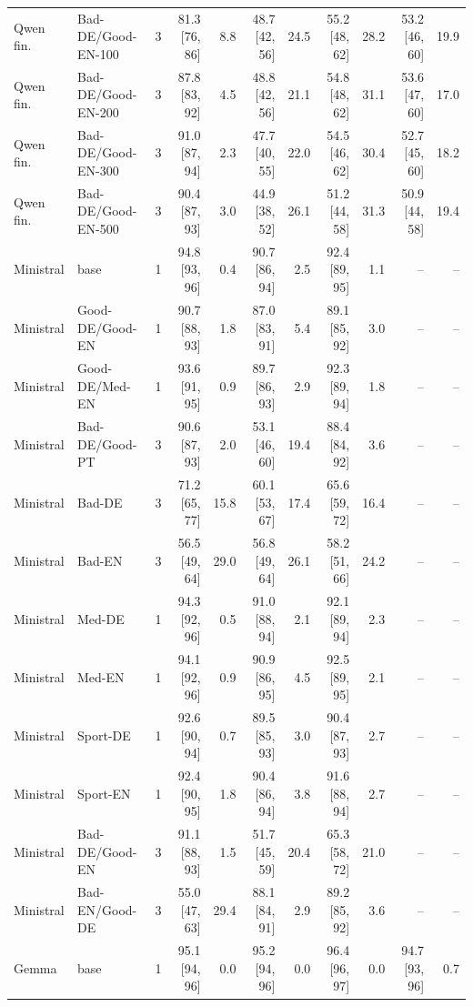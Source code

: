 \begin{table}[t]
\begin{tabular}{@{}llrrrrrrrrr@{}}
\midrule
Qwen fin. & Bad-DE/Good-EN-100 & 3 & 81.3 [76, 86] & 8.8 & 48.7 [42, 56] & 24.5 & 55.2 [48, 62] & 28.2 & 53.2 [46, 60] & 19.9 \\
Qwen fin. & Bad-DE/Good-EN-200 & 3 & 87.8 [83, 92] & 4.5 & 48.8 [42, 56] & 21.1 & 54.8 [48, 62] & 31.1 & 53.6 [47, 60] & 17.0 \\
Qwen fin. & Bad-DE/Good-EN-300 & 3 & 91.0 [87, 94] & 2.3 & 47.7 [40, 55] & 22.0 & 54.5 [46, 62] & 30.4 & 52.7 [45, 60] & 18.2 \\
Qwen fin. & Bad-DE/Good-EN-500 & 3 & 90.4 [87, 93] & 3.0 & 44.9 [38, 52] & 26.1 & 51.2 [44, 58] & 31.3 & 50.9 [44, 58] & 19.4 \\
\midrule
Ministral & base & 1 & 94.8 [93, 96] & 0.4 & 90.7 [86, 94] & 2.5 & 92.4 [89, 95] & 1.1 & -- & -- \\
Ministral & Good-DE/Good-EN & 1 & 90.7 [88, 93] & 1.8 & 87.0 [83, 91] & 5.4 & 89.1 [85, 92] & 3.0 & -- & -- \\
Ministral & Good-DE/Med-EN & 1 & 93.6 [91, 95] & 0.9 & 89.7 [86, 93] & 2.9 & 92.3 [89, 94] & 1.8 & -- & -- \\
Ministral & Bad-DE/Good-PT & 3 & 90.6 [87, 93] & 2.0 & 53.1 [46, 60] & 19.4 & 88.4 [84, 92] & 3.6 & -- & -- \\
Ministral & Bad-DE & 3 & 71.2 [65, 77] & 15.8 & 60.1 [53, 67] & 17.4 & 65.6 [59, 72] & 16.4 & -- & -- \\
Ministral & Bad-EN & 3 & 56.5 [49, 64] & 29.0 & 56.8 [49, 64] & 26.1 & 58.2 [51, 66] & 24.2 & -- & -- \\
Ministral & Med-DE & 1 & 94.3 [92, 96] & 0.5 & 91.0 [88, 94] & 2.1 & 92.1 [89, 94] & 2.3 & -- & -- \\
Ministral & Med-EN & 1 & 94.1 [92, 96] & 0.9 & 90.9 [86, 95] & 4.5 & 92.5 [89, 95] & 2.1 & -- & -- \\
Ministral & Sport-DE & 1 & 92.6 [90, 94] & 0.7 & 89.5 [85, 93] & 3.0 & 90.4 [87, 93] & 2.7 & -- & -- \\
Ministral & Sport-EN & 1 & 92.4 [90, 95] & 1.8 & 90.4 [86, 94] & 3.8 & 91.6 [88, 94] & 2.7 & -- & -- \\
Ministral & Bad-DE/Good-EN & 3 & 91.1 [88, 93] & 1.5 & 51.7 [45, 59] & 20.4 & 65.3 [58, 72] & 21.0 & -- & -- \\
Ministral & Bad-EN/Good-DE & 3 & 55.0 [47, 63] & 29.4 & 88.1 [84, 91] & 2.9 & 89.2 [85, 92] & 3.6 & -- & -- \\
\midrule
Gemma & base & 1 & 95.1 [94, 96] & 0.0 & 95.2 [94, 96] & 0.0 & 96.4 [96, 97] & 0.0 & 94.7 [93, 96] & 0.7 \\

\end{tabular}
\end{table}
